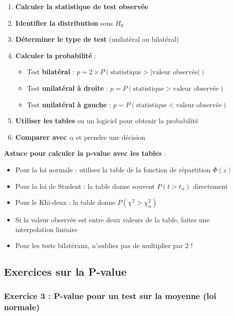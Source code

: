 \documentclass[11pt,a4paper]{article}
\newcommand{\chideux}{\chi^2}
\begin{document}
\begin{enumerate}
    \item \textbf{Calculer la statistique de test observée}
    \item \textbf{Identifier la distribution} sous $H_0$
    \item \textbf{Déterminer le type de test} (unilatéral ou bilatéral)
    \item \textbf{Calculer la probabilité} :
    \begin{itemize}
        \item Test \textbf{bilatéral} : $p = 2 \times P(\text{statistique} > |\text{valeur observée}|)$
        \item Test \textbf{unilatéral à droite} : $p = P(\text{statistique} > \text{valeur observée})$
        \item Test \textbf{unilatéral à gauche} : $p = P(\text{statistique} < \text{valeur observée})$
    \end{itemize}
    \item \textbf{Utiliser les tables} ou un logiciel pour obtenir la probabilité
    \item \textbf{Comparer avec $\alpha$} et prendre une décision
\end{enumerate}

\begin{astucebox}
\textbf{Astuce pour calculer la p-value avec les tables} :
\begin{itemize}
    \item Pour la loi normale : utilisez la table de la fonction de répartition $\Phi(z)$
    \item Pour la loi de Student : la table donne souvent $P(t > t_{\alpha})$ directement
    \item Pour le Khi-deux : la table donne $P(\chideux > \chideux_{\alpha})$
    \item Si la valeur observée est entre deux valeurs de la table, faites une interpolation linéaire
    \item Pour les tests bilatéraux, n'oubliez pas de multiplier par 2 !
\end{itemize}
\end{astucebox}

\newpage

\subsection{Exercices sur la P-value}

\subsubsection{Exercice 3 : P-value pour un test sur la moyenne (loi normale)}
\end{document}
